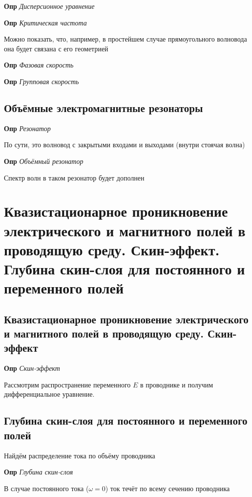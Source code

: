 \documentclass[a4paper, 14pt]{article}
\begin{document}
    \textbf{Опр} \textit{Дисперсионное уравнение}
    
    \textbf{Опр} \textit{Критическая частота}
    
    Можно показать, что, например, в простейшем случае прямоугольного волновода она будет связана с его геометрией
    
    \textbf{Опр} \textit{Фазовая скорость}
    
    \textbf{Опр} \textit{Групповая скорость}
    
    \subsection{Объёмные электромагнитные резонаторы}
    
    \textbf{Опр} \textit{Резонатор}
    
    По сути, это волновод с закрытыми входами и выходами (внутри стоячая волна)
    
    \textbf{Опр} \textit{Объёмный резонатор}
    
    Спектр волн в таком резонатор будет дополнен
    
    \section{Квазистационарное проникновение электрического и магнитного полей в проводящую среду. Скин-эффект.
    Глубина скин-слоя для постоянного и переменного полей}
    
    \subsection{Квазистационарное проникновение электрического и магнитного полей в проводящую среду. Скин-эффект}
    
    \textbf{Опр} \textit{Скин-эффект}
    
    Рассмотрим распространение переменного $E$ в проводнике и получим дифференциальное уравнение.
    
    \subsection{Глубина скин-слоя для постоянного и переменного полей}
    
    Найдём распределение тока по объёму проводника
    
    \textbf{Опр} \textit{Глубина скин-слоя}
    
    В случае постоянного тока ($\omega = 0$) ток течёт по всему сечению проводника
    
\end{document}

